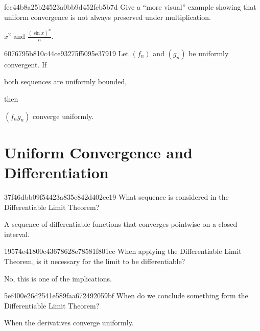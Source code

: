 \begin{note}{fec44b8a25b24523a0bb9d452feb5b7d}
    Give a ``more visual'' example showing that uniform convergence is not always preserved under multiplication.

    \begin{cloze}{1}
        \({ x^2 }\) and \({ \frac{(\sin x)^n}{n} }\).
    \end{cloze}
\end{note}

\begin{note}{6076795b810c44ce93275f5095e37919}
    Let \({ (f_n) }\) and \({ (g_n) }\) be uniformly convergent.
    If \begin{icloze}{2}both sequences are uniformly bounded,\end{icloze} then \begin{icloze}{1}\({ (f_n g_n) }\) converge uniformly.\end{icloze}
\end{note}

\section{Uniform Convergence and Differentiation} %
\begin{note}{37f46dbb09f54423a835e842d402ee19}
    What sequence is considered in the Differentiable Limit Theorem?

    \begin{cloze}{1}
        A sequence of differentiable functions that converges point\-wise on a closed interval.
    \end{cloze}
\end{note}

\begin{note}{19574e41800e43678628e78581f801cc}
    When applying the Differentiable Limit Theorem, is it necessary for the limit to be differentiable?

    \begin{cloze}{1}
        No, this is one of the implications.
    \end{cloze}
\end{note}

\begin{note}{5ef400e26d2541e589faa672492059bf}
    When do we conclude something form the Differentiable Limit Theorem?

    \begin{cloze}{1}
        When the derivatives converge uniformly.
    \end{cloze}
\end{note}


